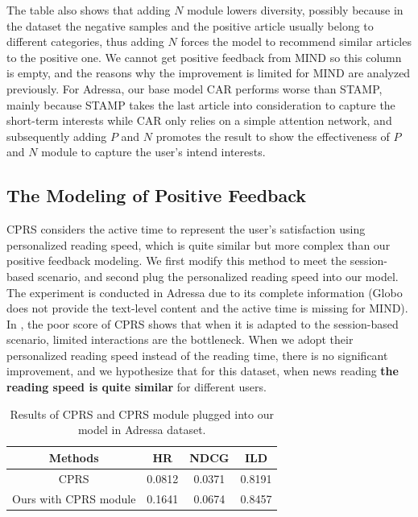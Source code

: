 The table also shows that adding $N$ module lowers diversity, possibly because in the dataset the negative samples and the positive article usually belong to different categories, thus adding $N$ forces the model to recommend similar articles to the positive one. We cannot get positive feedback from MIND so this column is empty, and the reasons why the improvement is limited for MIND are analyzed previously. For Adressa, our base model CAR performs worse than STAMP, mainly because STAMP takes the last article into consideration to capture the short-term interests while CAR only relies on a simple attention network, and subsequently adding $P$ and $N$ promotes the result to show the effectiveness of $P$ and $N$ module to capture the user's intend interests.

\subsection{The Modeling of Positive Feedback}
CPRS considers the active time to represent the user's satisfaction using personalized reading speed, which is quite similar but more complex than our positive feedback modeling. We first modify this method to meet the 
session-based scenario, and second plug the personalized reading speed into our model. 
The experiment is conducted in Adressa due to its complete information 
(Globo does not provide the text-level content and the active time is missing for MIND). 
In , the poor score of CPRS shows that when it is adapted to the session-based scenario, 
limited interactions are the bottleneck. When we adopt their personalized reading speed instead of 
the reading time, there is no significant improvement, and we hypothesize that for this dataset, 
when news reading \textbf{the reading speed is quite similar} for different users.

\begin{table}[th]\setlength{\tabcolsep}{5pt}
  \caption{Results of CPRS and CPRS module plugged into our model in Adressa dataset.}
  \label{tb:CPRS}
  \centering
  \begin{tabular}{cccc}
    \toprule
    Methods  & HR & NDCG & ILD \\
    \midrule
    CPRS &0.0812 & 0.0371 & 0.8191 \\
    Ours with CPRS module & 0.1641 & 0.0674 & 0.8457\\
    \bottomrule
  \end{tabular}
\end{table}

